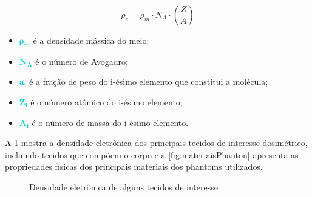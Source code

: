 \documentclass[11pt,a4paper]{article}
\newcounter{exemplo}
\begin{document}
		\begin{equation}
			\rho_e = \rho_m \cdot N_A \cdot \left(\frac{Z}{A}\right)
			\label{eq:densidadeEletronica}
		\end{equation}

		\begin{exemplo}[onde:]
			\begin{itemize}
				\begin{equation}
							\frac{Z}{A} = \sum_{i} a_i \cdot \frac{Z_i}{A_i}
				\end{equation}
				\item \textcolor{DarkTurquoise}{$\mathbf{\rho_m}$} é a densidade mássica do meio;
				\item \textcolor{DarkTurquoise}{$\mathbf{N_A}$} é o número de Avogadro;
				\item \textcolor{DarkTurquoise}{$\mathbf{a_i}$} é a fração de peso do i-ésimo elemento que constitui a molécula;
				\item \textcolor{DarkTurquoise}{$\mathbf{Z_i}$} é o número atômico do i-ésimo elemento;
				\item \textcolor{DarkTurquoise}{$\mathbf{A_i}$} é o número de massa do i-ésimo elemento.
			  \end{itemize}
		\end{exemplo}

	A \ref{fig:densidadeEletronica} mostra a densidade eletrônica dos principais tecidos de interesse dosimétrico, incluindo tecidos que compõem o corpo e a \ref{fig:materiaisPhanton} apresenta as propriedades físicas dos principais materiais dos phantoms utilizados.

		\begin{figure}[h]
			\centering
			\caption{Densidade eletrônica de alguns tecidos de interesse}
			\label{fig:densidadeEletronica}
		\end{figure}
\end{document}
